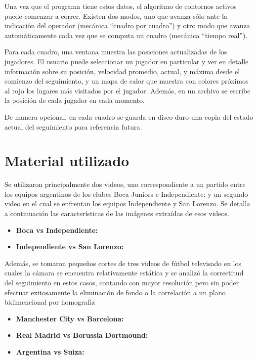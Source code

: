 Una vez que el programa tiene estos datos, el algoritmo de contornos activos puede comenzar a correr. Existen dos modos, uno que avanza sólo ante la indicación del operador (mecánica ``cuadro por cuadro'') y otro modo que avanza automáticamente cada vez que se computa un cuadro (mecánica ``tiempo real'').  %

Para cada cuadro, una ventana muestra las posiciones actualizadas de los jugadores. El usuario puede seleccionar un jugador en particular y ver en detalle información sobre su posición, velocidad promedio, actual, y máxima desde el comienzo del seguimiento, y un mapa de calor que muestra con colores próximos al rojo los lugares más visitados por el jugador. Además, en un archivo se escribe la posición de cada jugador en cada momento.

De manera opcional, en cada cuadro se guarda en disco duro una copia del estado actual del seguimiento para referencia futura.

\section{Material utilizado}

Se utilizaron principalmente dos videos, uno correspondiente a un partido entre los equipos argentinos de los clubes Boca Juniors e Independiente; y un segundo video en el cual se enfrentan los equipos Independiente y San Lorenzo. Se detalla a continuación las características de las imágenes extraídas de esos videos.

\begin{itemize}
  \item \textbf{Boca vs Independiente:}
  \item \textbf{Independiente vs San Lorenzo:}
\end{itemize}

Además, se tomaron pequeños cortes de tres videos de fútbol televisado en los cuales la cámara se encuentra relativamente estática y se analizó la correctitud del seguimiento en estos casos, contando con mayor resolución pero sin poder efectuar exitosamente la eliminación de fondo o la correlación a un plano bidimencional por homografía %

\begin{itemize}
  \item \textbf{Manchester City vs Barcelona:}
  \item \textbf{Real Madrid vs Borussia Dortmound:}
  \item \textbf{Argentina vs Suiza:}
\end{itemize}

